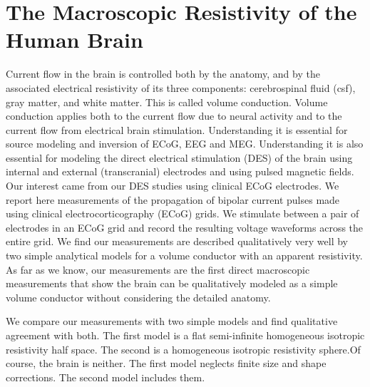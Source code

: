 
\chapter {The Macroscopic Resistivity of the Human Brain}
\label{chap:macroscopicResistivity}

Current flow in the brain is controlled both by the anatomy, and by the associated electrical resistivity of its three components: cerebrospinal fluid (csf), gray matter, and white matter. This is called volume conduction. Volume conduction applies both to the current flow due to neural activity and to the current flow from electrical brain stimulation. Understanding it is essential for source modeling and inversion of ECoG, EEG and MEG. Understanding it is also essential for modeling the direct electrical stimulation (DES) of the brain using internal and external (transcranial) electrodes and using pulsed magnetic fields. Our interest came from our DES studies using clinical ECoG electrodes. We report here measurements of the propagation of bipolar current pulses made using clinical electrocorticography (ECoG) grids. We stimulate between a pair of electrodes in an ECoG grid and record the resulting voltage waveforms across the entire grid. We find our measurements are described qualitatively very well by two simple analytical models for a volume conductor with an apparent resistivity. As far as we know, our measurements are the first direct macroscopic measurements that show the brain can be qualitatively modeled as a simple volume conductor without considering the detailed anatomy. 

We compare our measurements with two simple models and find qualitative agreement with both. The first model is a flat semi-infinite homogeneous isotropic resistivity half space. The second is a homogeneous isotropic resistivity sphere.Of course, the brain is neither. The first model neglects finite size and shape corrections. The second model includes them.

